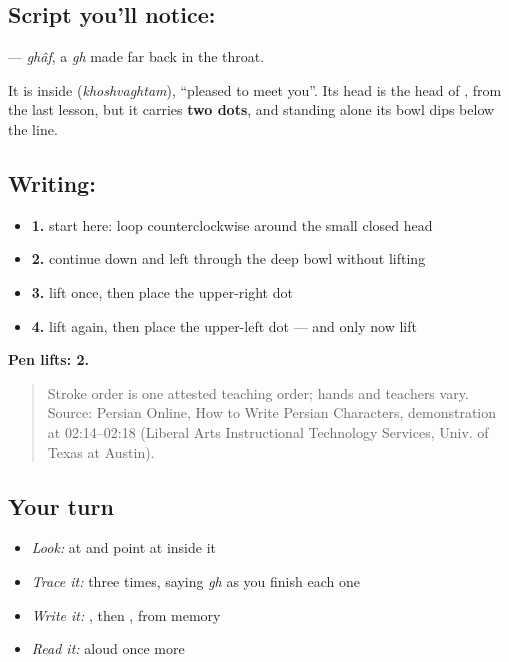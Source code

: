 \subsection*{Script you'll notice: }
\textbf{} — \emph{ghâf}, a \emph{gh} made far back in the throat.

It is inside \textbf{} (\emph{khoshvaghtam}), \textquotedblleft{}pleased to meet you\textquotedblright{}. Its head is the head of \textbf{}, from the last lesson, but it carries \textbf{two dots}, and standing alone its bowl dips below the line.

\subsection*{Writing: }

\begin{itemize}
\raggedright
  \item \textbf{1.} start here: loop counterclockwise around the small closed head
  \item \textbf{2.} continue down and left through the deep bowl without lifting
  \item \textbf{3.} lift once, then place the upper-right dot
  \item \textbf{4.} lift again, then place the upper-left dot — and only now lift
\end{itemize}

\textbf{Pen lifts: 2.}

\begin{quote}
Stroke order is one attested teaching order; hands and teachers vary. Source: Persian Online, How to Write Persian Characters,  demonstration at 02:14–02:18 (Liberal Arts Instructional Technology Services, Univ. of Texas at Austin).
\end{quote}

\subsection*{Your turn}
\begin{itemize}
\raggedright
  \item \emph{Look:} at \textbf{} and point at  inside it
  \item \emph{Trace it:}  three times, saying \emph{gh} as you finish each one
  \item \emph{Write it:} , then , from memory
  \item \emph{Read it:} \textbf{} aloud once more
\end{itemize}

